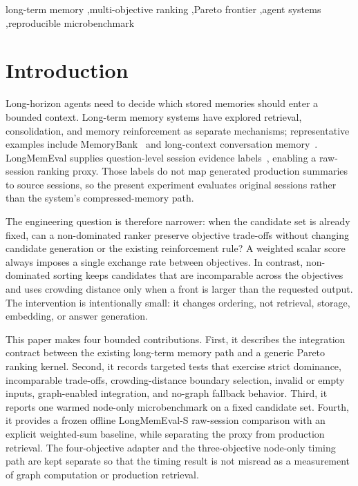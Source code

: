 \documentclass[review,12pt]{elsarticle}
\begin{document}
\begin{frontmatter}
\begin{keyword}
long-term memory \sep multi-objective ranking \sep Pareto frontier \sep agent systems \sep reproducible microbenchmark
\end{keyword}

\end{frontmatter}

\section{Introduction}
\label{sec:introduction}

Long-horizon agents need to decide which stored memories should enter a bounded context. Long-term memory systems have explored retrieval, consolidation, and memory reinforcement as separate mechanisms; representative examples include MemoryBank~\cite{zhong2023memorybank} and long-context conversation memory~\cite{xu2022goldfish}. LongMemEval supplies question-level session evidence labels~\cite{wu2024longmemeval}, enabling a raw-session ranking proxy. Those labels do not map generated production summaries to source sessions, so the present experiment evaluates original sessions rather than the system's compressed-memory path.

The engineering question is therefore narrower: when the candidate set is already fixed, can a non-dominated ranker preserve objective trade-offs without changing candidate generation or the existing reinforcement rule? A weighted scalar score always imposes a single exchange rate between objectives. In contrast, non-dominated sorting keeps candidates that are incomparable across the objectives and uses crowding distance only when a front is larger than the requested output. The intervention is intentionally small: it changes ordering, not retrieval, storage, embedding, or answer generation.

This paper makes four bounded contributions. First, it describes the integration contract between the existing long-term memory path and a generic Pareto ranking kernel. Second, it records targeted tests that exercise strict dominance, incomparable trade-offs, crowding-distance boundary selection, invalid or empty inputs, graph-enabled integration, and no-graph fallback behavior. Third, it reports one warmed node-only microbenchmark on a fixed candidate set. Fourth, it provides a frozen offline LongMemEval-S raw-session comparison with an explicit weighted-sum baseline, while separating the proxy from production retrieval. The four-objective adapter and the three-objective node-only timing path are kept separate so that the timing result is not misread as a measurement of graph computation or production retrieval.
\end{document}

